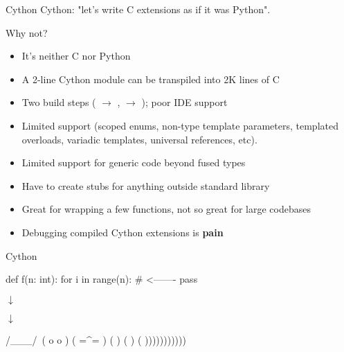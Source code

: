 \documentclass[10pt]{beamer}
\newcommand\cpp[1]{\cpluspluslogo #1}
\newcommand\mono[1]{\texttt{\footnotesize{\detokenize{#1}}}\xspace}
\newcommand\darrow{\parbox{3cm}{\centering$\downarrow$}\smallskip}
\begin{document}

\begin{frame}{Cython}
    Cython: "let's write C extensions as if it was Python".

    \pause

    Why not?

    \begin{itemize}
        \item \pause It's neither C nor Python
        \item \pause A 2-line Cython module can be transpiled into 2K lines of C
        \item \pause Two build steps (\mono{.pyx} $\rightarrow$ \mono{.c}, \mono{.c} $\rightarrow$ \mono{.so}); poor IDE support
        \item \pause Limited \cpp{} support (scoped enums, non-type
            template parameters, templated overloads, variadic templates,
            universal references, etc).
        \item \pause Limited support for generic code beyond fused types
        \item \pause Have to create stubs for anything outside standard library
        \item \pause Great for wrapping a few functions, not so great for large codebases
        \item \pause Debugging compiled Cython extensions is \textbf{pain}
    \end{itemize}
\end{frame}


\begin{frame}[fragile]{Cython}

    \begin{pythoncode}
        def f(n: int):
            for i in range(n):  # <-------
                pass
    \end{pythoncode}

    \pause \darrow


    \pause \darrow

    \begin{shcode}
      /\___/\
     ( o   o )
     (  =^=  )
     (        )
     (         )
     (          )))))))))))
    \end{shcode}

\end{frame}
\end{document}
